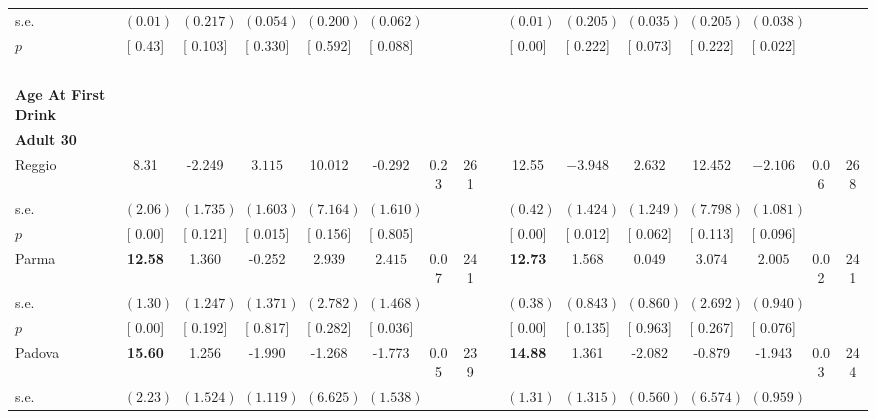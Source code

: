 \begin{longtable}{L{8em} c c c c c c c p{1em} c c c c c c c}
\quad \quad \quad \quad s.e.& $ (     0.01)$ & $ (    0.217)$ & $ (    0.054)$ & $ (    0.200)$ & $ (    0.062)$ & & & & $ (     0.01)$ & $ (    0.205)$ & $ (    0.035)$ & $ (    0.205)$ & $ (    0.038)$ & &  \\*
\quad \quad \quad \quad $ p$ & [     0.43] & [    0.103] & [    0.330] & [    0.592] & [    0.088] & & & & [     0.00] & [    0.222] & [    0.073] & [    0.222] & [    0.022] & &  \\[1em]
~\\[1em]
\textbf{Age At First Drink} \\*
\quad \quad \textbf{Adult 30} & & & & & & & & & & & & & & & \\* 
\quad \quad \quad Reggio& 8.31 &    -2.249 & $ \mathbf{    3.115}$ &    10.012 &    -0.292 &      0.23 &       261 & & 12.55 & $ \mathbf{   -3.948}$ & $ \mathbf{    2.632}$ &    12.452 & $ \mathbf{   -2.106}$ &      0.06 &       268  \\*
\quad \quad \quad \quad s.e.& $ (     2.06)$ & $ (    1.735)$ & $ (    1.603)$ & $ (    7.164)$ & $ (    1.610)$ & & & & $ (     0.42)$ & $ (    1.424)$ & $ (    1.249)$ & $ (    7.798)$ & $ (    1.081)$ & &  \\*
\quad \quad \quad \quad $ p$ & [     0.00] & [    0.121] & [    0.015] & [    0.156] & [    0.805] & & & & [     0.00] & [    0.012] & [    0.062] & [    0.113] & [    0.096] & &  \\[1em]
\quad \quad \quad Parma& \textbf{    12.58} &     1.360 &    -0.252 &     2.939 & $ \mathbf{    2.415}$ &      0.07 &       241 & & \textbf{    12.73} &     1.568 &     0.049 &     3.074 & $ \mathbf{    2.005}$ &      0.02 &       241  \\*
\quad \quad \quad \quad s.e.& $ (     1.30)$ & $ (    1.247)$ & $ (    1.371)$ & $ (    2.782)$ & $ (    1.468)$ & & & & $ (     0.38)$ & $ (    0.843)$ & $ (    0.860)$ & $ (    2.692)$ & $ (    0.940)$ & &  \\*
\quad \quad \quad \quad $ p$ & [     0.00] & [    0.192] & [    0.817] & [    0.282] & [    0.036] & & & & [     0.00] & [    0.135] & [    0.963] & [    0.267] & [    0.076] & &  \\[1em]
\quad \quad \quad Padova& \textbf{    15.60} &     1.256 &    -1.990 &    -1.268 &    -1.773 &      0.05 &       239 & & \textbf{    14.88} &     1.361 &    -2.082 &    -0.879 &    -1.943 &      0.03 &       244  \\*
\quad \quad \quad \quad s.e.& $ (     2.23)$ & $ (    1.524)$ & $ (    1.119)$ & $ (    6.625)$ & $ (    1.538)$ & & & & $ (     1.31)$ & $ (    1.315)$ & $ (    0.560)$ & $ (    6.574)$ & $ (    0.959)$ & &  \\*

\end{longtable}
